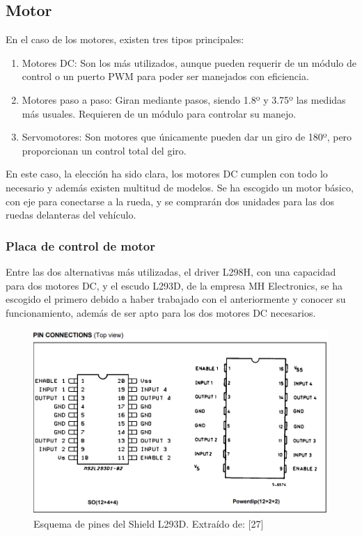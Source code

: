  \subsection{Motor}

 En el caso de los motores, existen tres tipos principales: 

 \begin{enumerate}
  \item Motores DC: Son los más utilizados, aunque pueden requerir de un módulo de control o un puerto PWM para poder ser manejados con eficiencia.
  \item Motores paso a paso: Giran mediante pasos, siendo 1.8º y 3.75º las medidas más usuales. Requieren de un módulo para controlar su manejo.
  \item Servomotores: Son motores que únicamente pueden dar un giro de 180º, pero proporcionan un control total del giro.
 \end{enumerate}

 En este caso, la elección ha sido clara, los motores DC cumplen con todo lo necesario y además existen multitud de modelos. 
 Se ha escogido un motor básico, con eje para conectarse a la rueda, y se comprarán dos unidades para las dos ruedas delanteras del vehículo. 

 \subsubsection{Placa de control de motor}

 Entre las dos alternativas más utilizadas, el driver L298H, con una capacidad para dos motores DC, y el escudo L293D, de la empresa MH Electronics, se ha escogido el primero debido a haber trabajado con el anteriormente y conocer su funcionamiento, además de ser apto para los dos motores DC necesarios. 

 \begin{figure}[H]
  \centering
  \includegraphics[width=1\textwidth]{imagenes/pinout_L293D.png}
  \caption{Esquema de pines del Shield L293D. Extraído de: [27]}
\end{figure}

